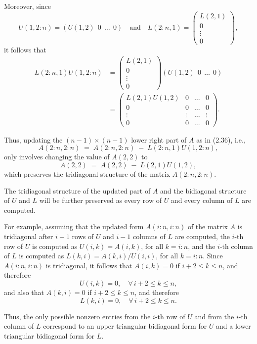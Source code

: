 Moreover, since
\[
U(1,2:n) = (U(1,2)\ \ 0\ \ \dots\ \ 0)
\quad\text{and}\quad
L(2:n,1) = \begin{pmatrix} L(2,1) \\ 0 \\ \vdots \\ 0 \end{pmatrix},
\]
it follows that
\begin{align*}
L(2:n,1)U(1,2:n)
&= \begin{pmatrix} L(2,1) \\ 0 \\ \vdots \\ 0 \end{pmatrix} (U(1,2)\ \ 0\ \ \dots\ \ 0) \\
&= \begin{pmatrix}
L(2,1)U(1,2) & 0 & \dots & 0 \\
0 & 0 & \dots & 0 \\
\vdots & \vdots & \dots & \vdots \\
0 & 0 & \dots & 0
\end{pmatrix}.
\end{align*}

Thus, updating the $(n-1)\times(n-1)$ lower right part of $A$ as in (2.36),
i.e.,
\[
A(2:n,2:n) \;=\; A(2:n,2:n) \;-\; L(2:n,1)U(1,2:n),
\]
only involves changing the value of $A(2,2)$ to
\[
A(2,2) \;=\; A(2,2) \;-\; L(2,1)U(1,2),
\]
which preserves the tridiagonal structure of the matrix $A(2:n,2:n)$.

The tridiagonal structure of the updated part of $A$ and the bidiagonal
structure of $U$ and $L$ will be further preserved as every row of $U$ and
every column of $L$ are computed.

For example, assuming that the updated form $A(i:n,i:n)$ of the matrix $A$
is tridiagonal after $i-1$ rows of $U$ and $i-1$ columns of $L$ are
computed, the $i$-th row of $U$ is computed as $U(i,k)=A(i,k)$, for all
$k=i:n$, and the $i$-th column of $L$ is computed as $L(k,i)=A(k,i)/U(i,i)$,
for all $k=i:n$. Since $A(i:n,i:n)$ is tridiagonal, it follows that
$A(i,k)=0$ if $i+2\le k\le n$, and therefore
\[
U(i,k)=0, \quad \forall\, i+2\le k\le n,
\]
and also that $A(k,i)=0$ if $i+2\le k\le n$, and therefore
\[
L(k,i)=0, \quad \forall\, i+2\le k\le n.
\]

Thus, the only possible nonzero entries from the $i$-th row of $U$ and from
the $i$-th column of $L$ correspond to an upper triangular bidiagonal form
for $U$ and a lower triangular bidiagonal form for $L$.
